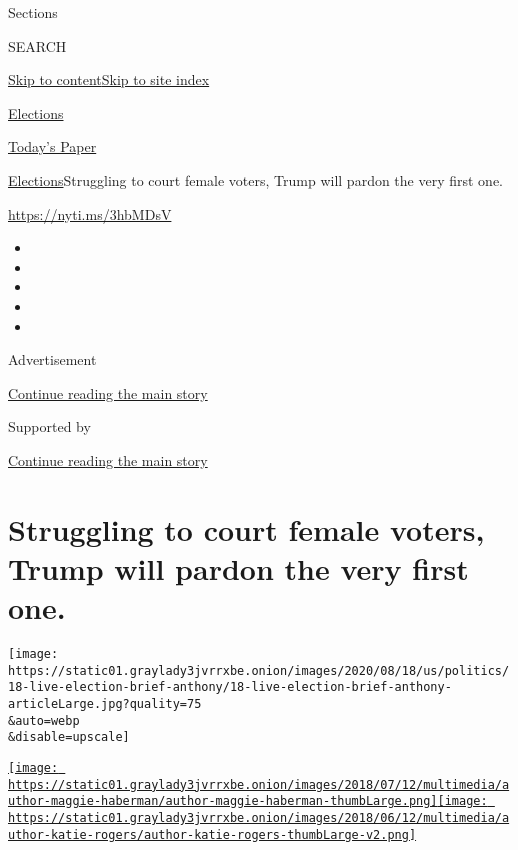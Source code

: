 Sections

SEARCH

\protect\hyperlink{site-content}{Skip to
content}\protect\hyperlink{site-index}{Skip to site index}

\href{https://www.nytimes3xbfgragh.onion/news-event/2020-election}{Elections}

\href{https://myaccount.nytimes3xbfgragh.onion/auth/login?response_type=cookie\&client_id=vi}{}

\href{https://www.nytimes3xbfgragh.onion/section/todayspaper}{Today's
Paper}

\href{/news-event/2020-election}{Elections}\textbar{}Struggling to court
female voters, Trump will pardon the very first one.

\url{https://nyti.ms/3hbMDsV}

\begin{itemize}
\item
\item
\item
\item
\item
\end{itemize}

Advertisement

\protect\hyperlink{after-top}{Continue reading the main story}

Supported by

\protect\hyperlink{after-sponsor}{Continue reading the main story}

\hypertarget{struggling-to-court-female-voters-trump-will-pardon-the-very-first-one}{%
\section{Struggling to court female voters, Trump will pardon the very
first
one.}\label{struggling-to-court-female-voters-trump-will-pardon-the-very-first-one}}

\texttt{[image: https://static01.graylady3jvrrxbe.onion/images/2020/08/18/us/politics/18-live-election-brief-anthony/18-live-election-brief-anthony-articleLarge.jpg?quality=75\\\&auto=webp\\\&disable=upscale]}

\href{https://www.nytimes3xbfgragh.onion/by/maggie-haberman}{\texttt{[image: https://static01.graylady3jvrrxbe.onion/images/2018/07/12/multimedia/author-maggie-haberman/author-maggie-haberman-thumbLarge.png]}}\href{https://www.nytimes3xbfgragh.onion/by/katie-rogers}{\texttt{[image: https://static01.graylady3jvrrxbe.onion/images/2018/06/12/multimedia/author-katie-rogers/author-katie-rogers-thumbLarge-v2.png]}}

